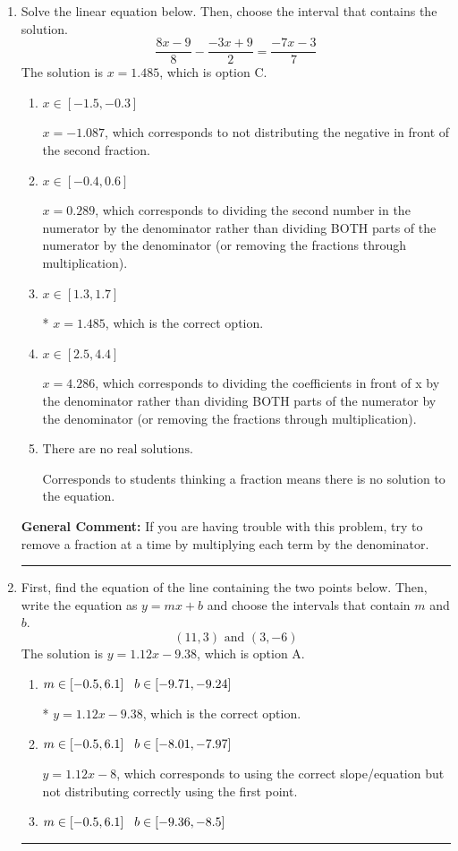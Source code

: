 \documentclass{extbook}[14pt]
\newcommand{\litem}[1]{\item #1

\rule{\textwidth}{0.4pt}}
\begin{document}
\begin{enumerate}\litem{
Solve the linear equation below. Then, choose the interval that contains the solution.
\[ \frac{8x -9}{8} - \frac{-3x + 9}{2} = \frac{-7x -3}{7} \]
The solution is \( x = 1.485 \), which is option C.\begin{enumerate}[label=\Alph*.]
\item \( x \in [-1.5, -0.3] \)

 $x = -1.087$, which corresponds to not distributing the negative in front of the second fraction.
\item \( x \in [-0.4, 0.6] \)

 $x = 0.289$, which corresponds to dividing the second number in the numerator by the denominator rather than dividing BOTH parts of the numerator by the denominator (or removing the fractions through multiplication).
\item \( x \in [1.3, 1.7] \)

* $x = 1.485$, which is the correct option.
\item \( x \in [2.5, 4.4] \)

 $x = 4.286$, which corresponds to dividing the coefficients in front of x by the denominator rather than dividing BOTH parts of the numerator by the denominator (or removing the fractions through multiplication).
\item \( \text{There are no real solutions.} \)

Corresponds to students thinking a fraction means there is no solution to the equation.
\end{enumerate}

\textbf{General Comment:} If you are having trouble with this problem, try to remove a fraction at a time by multiplying each term by the denominator.
}
\litem{
First, find the equation of the line containing the two points below. Then, write the equation as $ y=mx+b $ and choose the intervals that contain $m$ and $b$.
\[ (11, 3) \text{ and } (3, -6) \]
The solution is \( y = 1.12x -9.38 \), which is option A.\begin{enumerate}[label=\Alph*.]
\item \( m \in [-0.5, 6.1] \hspace*{3mm} b \in [-9.71, -9.24] \)

* $y = 1.12x -9.38$, which is the correct option.
\item \( m \in [-0.5, 6.1] \hspace*{3mm} b \in [-8.01, -7.97] \)

 $y = 1.12x -8$, which corresponds to using the correct slope/equation but not distributing correctly using the first point.
\item \( m \in [-0.5, 6.1] \hspace*{3mm} b \in [-9.36, -8.5] \)


\end{enumerate}}
\end{enumerate}
\end{document}
